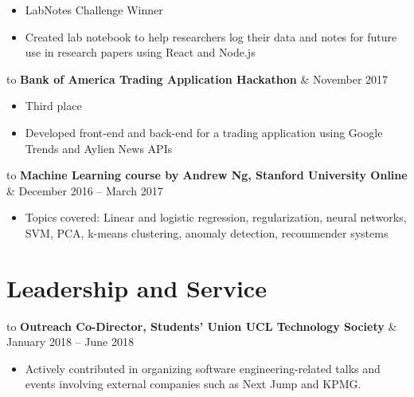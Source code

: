 \documentclass[a4paper, 10pt]{article}
\makeatletter
\newenvironment{details}{\addvspace{3pt} \begin{tabu} to \textwidth {@{}X[2l] X[1r]@{}}}{\end{tabu}}
\newcommand{\timerange}[1]{\normalsize #1}
\newcommand{\award}[1]{\normalsize \textbf{#1}}
\newcommand{\leadership}[1]{\normalsize \textbf{#1}}
\newenvironment{info}{\small \begin{itemize}[
    noitemsep,
    topsep=-3pt,
    leftmargin=*,
    align=parleft
]}{\end{itemize}}
\makeatother
\begin{document}
        \begin{info}
            \item LabNotes Challenge Winner
            \item Created lab notebook to help researchers log their data and notes for future use in research papers using React and Node.js 
        \end{info}
        
        \begin{details}
            \award{Bank of America Trading Application Hackathon} & \timerange{November 2017}
        \end{details}
        
        \begin{info}
            \item Third place
            \item Developed front-end and back-end for a trading application using Google Trends and Aylien News APIs
        \end{info}

        \begin{details}
            \award{Machine Learning course by Andrew Ng, Stanford University Online} & \timerange{December 2016 -- March 2017}
        \end{details}

        \begin{info}
            \item Topics covered: Linear and logistic regression, regularization, neural networks, SVM, PCA, k-means clustering, anomaly detection, recommender systems
        \end{info}

    \section*{Leadership and Service}

        \begin{details}
            \leadership{Outreach Co-Director, Students' Union UCL Technology Society} & \timerange{January 2018 -- June 2018}
        \end{details}

        \begin{info}
            \item Actively contributed in organizing software engineering-related talks and events involving external companies such as Next Jump and KPMG. 
        \end{info}
\end{document}

